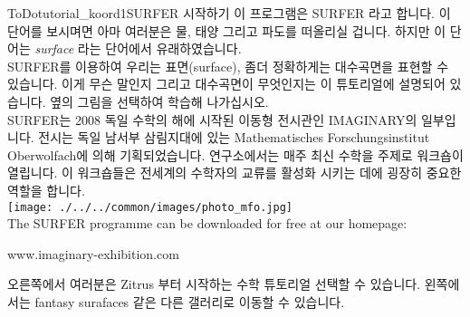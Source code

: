 \begin{surferIntroPage}{ToDo}{tutorial_koord1}{SURFER 시작하기}
이 프로그램은 SURFER 라고 합니다. 이 단어를 보시며면 아마 여러분은 물, 태양 그리고 파도를 떠올리실 겁니다. 하지만 이 단어는 {\it surface} 라는 단어에서 유래하였습니다.
\\
SURFER를 이용하여 우리는 표면(surface), 좀더 정확하게는 대수곡면을 표현할 수 있습니다. 이게 무슨 말인지 그리고 대수곡면이 무엇인지는 이 튜토리얼에 설명되어 있습니다. 옆의 그림을 선택하여 학습해 나가십시오.\\
SURFER는 2008 독일 수학의 해에 시작된 이동형 전시관인 IMAGINARY의 일부입니다. 전시는 독일 남서부 삼림지대에 있는 Mathematisches Forschungsinstitut Oberwolfach에 의해 기획되었습니다. 연구소에서는 매주 최신 수학을 주제로 워크숍이 열립니다. 이 워크숍들은 전세계의 수학자의 교류를 활성화 시키는 데에 굉장히 중요한 역할을 합니다.\\
\vspace{0.2cm} \hspace{3.5cm}\texttt{[image: ./../../common/images/photo\_mfo.jpg]}\\
The SURFER programme can be downloaded for free at our homepage: \\
\begin{centering}
www.imaginary-exhibition.com\\
\end{centering}
 \vspace{0.2cm}
오른쪽에서 여러분은 Zitrus 부터 시작하는 수학 튜토리얼 선택할 수 있습니다. 왼쪽에서는 fantasy surafaces 같은 다른 갤러리로 이동할 수 있습니다.
\end{surferIntroPage}
